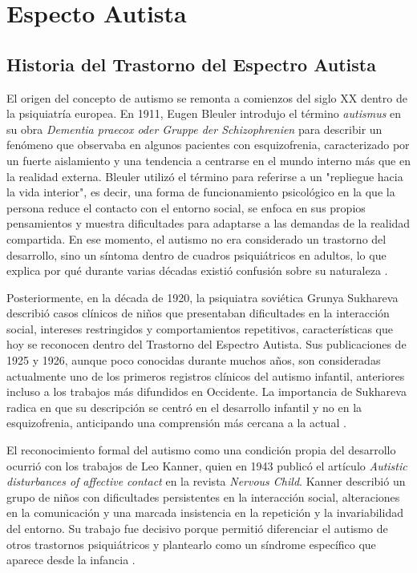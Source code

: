 \documentclass{book}
\begin{document}
\section{Especto Autista}
\subsection{Historia del Trastorno del Espectro Autista}

El origen del concepto de autismo se remonta a comienzos del siglo XX dentro de la psiquiatría europea. En 1911, Eugen Bleuler introdujo el término \textit{autismus} en su obra \textit{Dementia praecox oder Gruppe der Schizophrenien} para describir un fenómeno que observaba en algunos pacientes con esquizofrenia, caracterizado por un fuerte aislamiento y una tendencia a centrarse en el mundo interno más que en la realidad externa. Bleuler utilizó el término para referirse a un "repliegue hacia la vida interior", es decir, una forma de funcionamiento psicológico en la que la persona reduce el contacto con el entorno social, se enfoca en sus propios pensamientos y muestra dificultades para adaptarse a las demandas de la realidad compartida. En ese momento, el autismo no era considerado un trastorno del desarrollo, sino un síntoma dentro de cuadros psiquiátricos en adultos, lo que explica por qué durante varias décadas existió confusión sobre su naturaleza \cite{Bleuler1911}.

Posteriormente, en la década de 1920, la psiquiatra soviética Grunya Sukhareva describió casos clínicos de niños que presentaban dificultades en la interacción social, intereses restringidos y comportamientos repetitivos, características que hoy se reconocen dentro del Trastorno del Espectro Autista. Sus publicaciones de 1925 y 1926, aunque poco conocidas durante muchos años, son consideradas actualmente uno de los primeros registros clínicos del autismo infantil, anteriores incluso a los trabajos más difundidos en Occidente. La importancia de Sukhareva radica en que su descripción se centró en el desarrollo infantil y no en la esquizofrenia, anticipando una comprensión más cercana a la actual \cite{Sukhareva1926, Happe2020}.

El reconocimiento formal del autismo como una condición propia del desarrollo ocurrió con los trabajos de Leo Kanner, quien en 1943 publicó el artículo \textit{Autistic disturbances of affective contact} en la revista \textit{Nervous Child}. Kanner describió un grupo de niños con dificultades persistentes en la interacción social, alteraciones en la comunicación y una marcada insistencia en la repetición y la invariabilidad del entorno. Su trabajo fue decisivo porque permitió diferenciar el autismo de otros trastornos psiquiátricos y plantearlo como un síndrome específico que aparece desde la infancia \cite{kanner1943autistic}.
\end{document}
